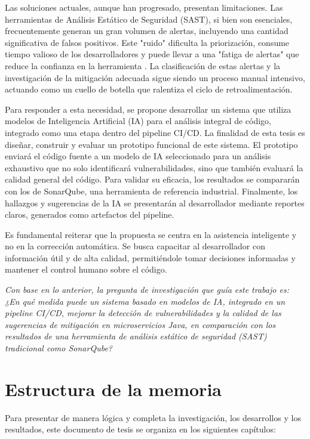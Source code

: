 Las soluciones actuales, aunque han progresado, presentan limitaciones. Las herramientas de Análisis Estático de Seguridad (SAST), si bien son esenciales, frecuentemente generan un gran volumen de alertas, incluyendo una cantidad significativa de falsos positivos. Este "ruido" dificulta la priorización, consume tiempo valioso de los desarrolladores y puede llevar a una "fatiga de alertas" que reduce la confianza en la herramienta \cite{Johnson2023UsabilitySAST}. La clasificación de estas alertas y la investigación de la mitigación adecuada sigue siendo un proceso manual intensivo, actuando como un cuello de botella que ralentiza el ciclo de retroalimentación.

Para responder a esta necesidad, se propone desarrollar un sistema que utiliza modelos de Inteligencia Artificial (IA) para el análisis integral de código, integrado como una etapa dentro del pipeline CI/CD. La finalidad de esta tesis es diseñar, construir y evaluar un prototipo funcional de este sistema. El prototipo enviará el código fuente a un modelo de IA seleccionado para un análisis exhaustivo que no solo identificará vulnerabilidades, sino que también evaluará la calidad general del código. Para validar su eficacia, los resultados se compararán con los de SonarQube, una herramienta de referencia industrial. Finalmente, los hallazgos y sugerencias de la IA se presentarán al desarrollador mediante reportes claros, generados como artefactos del pipeline.

Es fundamental reiterar que la propuesta se centra en la asistencia inteligente y no en la corrección automática. Se busca capacitar al desarrollador con información útil y de alta calidad, permitiéndole tomar decisiones informadas y mantener el control humano sobre el código.

\textit{Con base en lo anterior, la pregunta de investigación que guía este trabajo es: ¿En qué medida puede un sistema basado en modelos de IA, integrado en un pipeline CI/CD, mejorar la detección de vulnerabilidades y la calidad de las sugerencias de mitigación en microservicios Java, en comparación con los resultados de una herramienta de análisis estático de seguridad (SAST) tradicional como SonarQube?}

\section{Estructura de la memoria}\label{sec:estructura}
Para presentar de manera lógica y completa la investigación, los desarrollos y los resultados, este documento de tesis se organiza en los siguientes capítulos:

